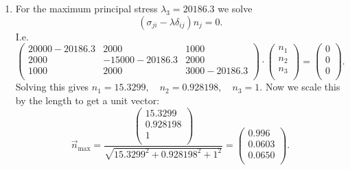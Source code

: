 \begin{derivation}
\begin{enumerate}[label=(\alph*)]
\begin{align*}
        \sigma^{(3)} &= \num{20186,3} 
      .\end{align*}
    \item[(e)] For the maximum principal stress $\lambda_3 = \num{20186,3}$ we solve
      \begin{equation*}
        (\sigma_{ji} - \lambda \delta_{ij}) n_j = 0
      .\end{equation*}
      I.e.
      \begin{equation*}
        \begin{pmatrix}
          \num{20000} - \num{20186,3} & \num{2000}  & \num{1000} \\
        \num{2000}  & - \num{15000} - \num{20186,3} & \num{2000} \\
        \num{1000}  & \num{2000} & \num{3000} - \num{20186,3} \\
        \end{pmatrix} \cdot \begin{pmatrix}
          n_1\\
        n_2\\
        n_3\\
        \end{pmatrix} = \begin{pmatrix}
          0\\
        0\\
        0\\
        \end{pmatrix}
    .\end{equation*}
    Solving this gives $n_1 = \num{15,3299}, \quad n_2 = \num{0,928198}, \quad n_3 = \num{1}$. Now we scale this by the length to get a unit vector:
    \begin{equation*}
      \Vec{n}_{\mathrm{max}} = \frac{\begin{pmatrix}
        \num{15,3299} \\
      \num{0,928198} \\
      \num{1} \\
      \end{pmatrix}}{\sqrt{ \num{15,3299}^2 + \num{0,928198}^2 + \num{1}^2}} = \left(
\begin{array}{c}
 0.996 \\
 0.0603\\
 0.0650 \\
\end{array}
\right)
    .\end{equation*}
  \end{enumerate}
\end{derivation}

